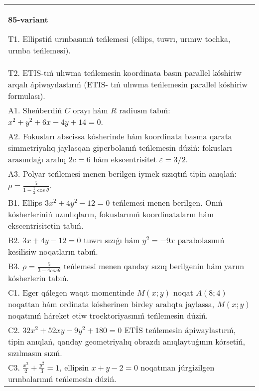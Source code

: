 \documentclass{article}
\begin{document}
\begin{tabular}{m{17cm}}
\textbf{85-variant}
\newline

T1. Ellipstiń urınbasınıń teńlemesi (ellips, tuwrı, urınıw tochka, urınba teńlemesi).\\

T2. ETIS-tıń ulıwma teńlemesin koordinata basın parallel kóshiriw arqalı ápiwayılastırıń (ETIS- tıń ulıwma teńlemesin parallel kóshiriw formulası).\\

A1. Sheńberdiń $C$ orayı hám $R$ radiusın tabıń: $x^2+y^2+6 x-4 y+14=0$.\\

A2. Fokusları abscissa kósherinde hám koordinata basına qarata simmetriyalıq jaylasqan giperbolanıń teńlemesin dúziń: fokusları arasındaǵı aralıq $2 c=6$ hám ekscentrisitet $\varepsilon=3/2$.\\

A3. Polyar teńlemesi menen berilgen iymek sızıqtıń tipin anıqlań: $\rho=\frac{5}{1-\frac{1}{2}\cos\theta}$.\\

B1. Ellips $3x^{2} + 4y^{2} - 12 = 0$ teńlemesi menen berilgen. Onıń kósherleriniń uzınlıqların, fokuslarınıń koordinataların hám ekscentrisitetin tabıń.  \\

B2. $3x + 4y - 12 = 0$ tuwrı sızıǵı hám $y^{2} = - 9x$ parabolasınıń kesilisiw noqatların tabıń.  \\

B3. $\rho = \frac{5}{3 - 4cos\theta}$ teńlemesi menen qanday sızıq berilgenin hám yarım kósherlerin tabıń.  \\

C1. Eger qálegen waqıt momentinde $M(x;y)$ noqat $A(8;4)$ noqattan hám ordinata kósherinen birdey aralıqta jaylassa, $M(x;y)$ noqatınıń háreket etiw troektoriyasınıń teńlemesin dúziń.  \\

C2. $32x^{2} + 52xy - 9y^{2} + 180 = 0$ ETİS teńlemesin ápiwaylastırıń, tipin anıqlań, qanday geometriyalıq obrazdı anıqlaytuǵının kórsetiń, sızılmasın sızıń.  \\

C3. $\frac{x^{2}}{2} + \frac{y^{2}}{3} = 1$, ellipsin $x + y - 2 = 0$ noqatınan júrgizilgen urınbalarınıń teńlemesin dúziń.  \\

\end{tabular}
\vspace{1cm}
\end{document}
